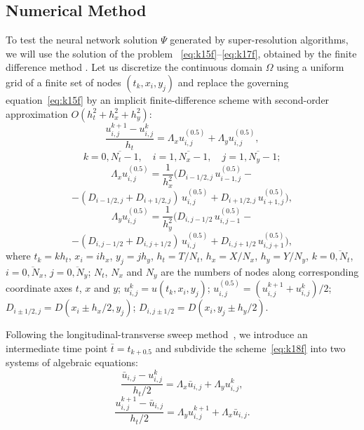 \documentclass{ieeeaccess}
\begin{document}
\subsection{Numerical Method}

To test the neural network solution $\Psi$  generated by super-resolution algorithms, we will use the solution of the problem ~\eqref{eq:k15f}–\eqref{eq:k17f}, obtained by the finite difference method \cite{Samarskii, Süli}. 
Let us discretize the continuous domain  $\Omega$ using a uniform  grid of a finite  set of nodes $(t_k, x_i, y_j)$ and replace the governing equation~\eqref{eq:k15f} by an implicit finite-difference scheme with second-order approximation $O(h_t^2 + h_x ^ 2 + h_y^ 2)$:  
%
\begin{equation}\label{eq:k18f}
    \frac{u_{i,j}^{k+1} - u_{i,j}^k}{h_t} = 
    \Lambda_x u_{i,j}^{(0.5)} + \Lambda_y u_{i,j}^{(0.5)}, 
    \end{equation}
$$
          k = \overline{0,N_t-1}, 
    \quad i = \overline{1,N_x-1}, 
    \quad j = \overline{1,N_y-1};
$$
$$
\Lambda_x u_{i,j}^{(0.5)} = \frac{1}{h_x^2} ( D_{i - 1/2,j} \, u_{i - 1,j}^{(0.5)} - 
$$
$$
- (D_{i - 1/2,j} +  D_{i + 1/2,j}) \, u_{i,j}^{(0.5)} + D_{i + 1/2,j} \, u_{i + 1,j}^{(0.5)} ),
$$
$$
\Lambda_y u_{i,j}^{(0.5)} = \frac{1}{h_y^2} ( D_{i,j - 1/2} \, u_{i,j - 1}^{(0.5)} - 
$$
$$
- (D_{i,j - 1/2} + D_{i,j + 1/2}) \, u_{i,j}^{(0.5)} + D_{i,j + 1/2} \, u_{i,j + 1}^{(0.5)} ),
$$
%
where $t_k = k h_t$, $x_i = i h_x$, $y_j = j h_y$, $h_t = T/N_t$, 
$h_x = X/N_x$, $h_y = Y/N_y$, $k = \overline {0,{N_t}}$, $i = \overline {0,{N_x}} $, $j = \overline {0,{N_y}}$; $N_t$, $N_x$ and $N_y$ are the numbers of nodes along corresponding coordinate axes $t$, $x$ and $y$; 
$u_{i,j}^k = u({t_k},{x_i},{y_j})$;
$ u_{i,j}^{(0.5)} = (u_{i,j}^{k+1} + u_{i,j}^k)/2 $; 
${D_{i \pm 1/2,j}} = D\left( {{x_i} \pm {h_x}/2,{y_j}} \right)$;
${D_{i,j \pm 1/2}} = D\left( {{x_i},{y_j} \pm {h_y}/2} \right)$.

Following the longitudinal-transverse sweep method~\cite{Samarskii}, we introduce an intermediate time point $\bar{t} = t_{k+0.5}$ and subdivide the scheme~\eqref{eq:k18f} into two systems of algebraic equations:
%
\begin{equation}\label{eq:k19f}
\frac{\bar{u}_{i,j} - u_{i,j}^k}{h_t/2} = \Lambda_x \bar{u}_{i,j} + \Lambda_y u_{i,j}^k,
\end{equation}
%
\begin{equation}\label{eq:k20f}
\frac{u_{i,j}^{k+1} - \bar{u}_{i,j}}{h_t/2} = \Lambda_y u_{i,j}^{k+1} + \Lambda_x \bar{u}_{i,j}.
\end{equation}
\end{document}
